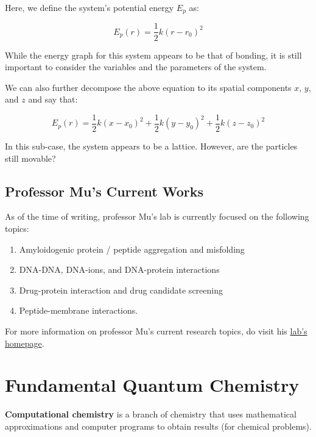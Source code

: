 \documentclass[
  letterpaper,
  DIV=11,
  numbers=noendperiod]{scrreprt}
\providecommand{\tightlist}{%
  \setlength{\itemsep}{0pt}\setlength{\parskip}{0pt}}\usepackage{longtable,booktabs,array}
\begin{document}
Here, we define the system's potential energy \(E_p\) as:

\begin{equation}
  E_p(r) = \frac{1}{2}k(r - r_0)^2
\end{equation}

While the energy graph for this system appears to be that of bonding, it
is still important to consider the variables and the parameters of the
system.

We can also further decompose the above equation to its spatial
components \(x\), \(y\), and \(z\) and say that:

\begin{equation}
E_p(r) = \frac{1}{2}k(x - x_0)^2 + \frac{1}{2}k(y - y_0)^2 + \frac{1}{2}k(z - z_0)^2
\end{equation}

In this sub-case, the system appears to be a lattice. However, are the
particles still movable?

\hypertarget{professor-mus-current-works}{%
\section{Professor Mu's Current
Works}\label{professor-mus-current-works}}

As of the time of writing, professor Mu's lab is currently focused on
the following topics:

\begin{enumerate}
\def\labelenumi{\arabic{enumi}.}
\tightlist
\item
  Amyloidogenic protein / peptide aggregation and misfolding
\item
  DNA-DNA, DNA-ions, and DNA-protein interactions
\item
  Drug-protein interaction and drug candidate screening
\item
  Peptide-membrane interactions.
\end{enumerate}

For more information on professor Mu's current research topics, do visit
his
\href{https://www.ntu.edu.sg/sbs/research/research-directory/Mu-Yuguang}{lab's
homepage}.

\hypertarget{fundamental-quantum-chemistry}{%
\chapter{Fundamental Quantum
Chemistry}\label{fundamental-quantum-chemistry}}

\textbf{Computational chemistry} is a branch of chemistry that uses
mathematical approximations and computer programs to obtain results (for
chemical problems).
\end{document}
